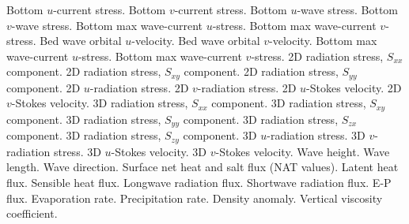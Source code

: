 \begin{klist}
\begin{klist}
\vspace{2 mm}
          Bottom $u$-current stress.
          Bottom $v$-current stress.
          Bottom $u$-wave stress.
          Bottom $v$-wave stress.
          Bottom max wave-current $u$-stress.
          Bottom max wave-current $v$-stress.
\vspace{2 mm}
          Bed wave orbital $u$-velocity.
          Bed wave orbital $v$-velocity.
          Bottom max wave-current $u$-stress.
          Bottom max wave-current $v$-stress.
\vspace{2 mm}
         2D radiation stress, $S_{xx}$ component.
         2D radiation stress, $S_{xy}$ component.
         2D radiation stress, $S_{yy}$ component.
         2D $u$-radiation stress.
         2D $v$-radiation stress.
         2D $u$-Stokes velocity.
         2D $v$-Stokes velocity.
\vspace{2 mm}
         3D radiation stress, $S_{xx}$ component.
         3D radiation stress, $S_{xy}$ component.
         3D radiation stress, $S_{yy}$ component.
         3D radiation stress, $S_{zx}$ component.
         3D radiation stress, $S_{zy}$ component.
         3D $u$-radiation stress.
         3D $v$-radiation stress.
         3D $u$-Stokes velocity.
         3D $v$-Stokes velocity.
\vspace{2 mm}
         Wave height.
         Wave length.
         Wave direction.
\vspace{2 mm}
         Surface net heat and salt flux (NAT values).
         Latent heat flux.
         Sensible heat flux.
         Longwave radiation flux.
         Shortwave radiation flux.
         E-P flux.
         Evaporation rate.
         Precipitation rate.
\vspace{2 mm}
          Density anomaly.
          Vertical viscosity coefficient.

\end{klist}
\end{klist}
